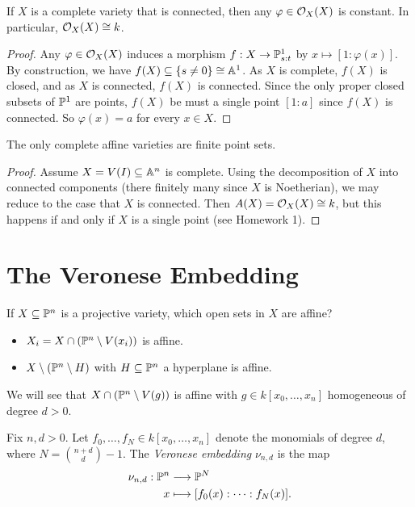 \begin{corollary}
  If $X$ is a complete variety that is
  connected, then any $\varphi \in \mathcal{O}_X(X)$
  is constant. In particular,
  $\mathcal{O}_X(X) \cong k$.
\end{corollary}

\begin{proof}
  Any $\varphi \in \mathcal{O}_X(X)$ induces a
  morphism $f : X \to \mathbb{P}^1_{s : t}$ by
  $x \mapsto [1 : \varphi(x)]$.
  By construction, we have
  $f(X) \subseteq \{s \ne 0\} \cong \mathbb{A}^1$.
  As $X$ is complete, $f(X)$ is closed,
  and as $X$ is connected, $f(X)$ is
  connected. Since the only proper closed
  subsets of $\mathbb{P}^1$ are points, $f(X)$
  be must a single point $[1 : a]$ since
  $f(X)$ is connected.
  So $\varphi(x) = a$ for every
  $x \in X$.
\end{proof}

\begin{corollary}
  The only complete affine varieties are
  finite point sets.
\end{corollary}

\begin{proof}
  Assume $X = V(I) \subseteq \mathbb{A}^n$ is
  complete. Using the decomposition
  of $X$ into connected components (there
  finitely many
  since $X$ is Noetherian), we may reduce
  to the case that $X$ is connected.
  Then $A(X) = \mathcal{O}_X(X) \cong k$, but this happens
  if and only if $X$ is a single point
  (see Homework 1).
\end{proof}

\section{The Veronese Embedding}

\begin{remark}
  If $X \subseteq \mathbb{P}^n$ is a projective
  variety, which open sets in $X$ are
  affine?
  \begin{itemize}
    \item $X_i = X \cap (\mathbb{P}^n \setminus
      V(x_i))$ is affine.
    \item $X \setminus (\mathbb{P}^n \setminus H)$
      with $H \subseteq \mathbb{P}^n$ a
      hyperplane is affine.
  \end{itemize}
  We will see that
  $X \cap (\mathbb{P}^n \setminus V(g))$ is affine
  with $g \in k[x_0, \ldots, x_n]$
  homogeneous of degree $d > 0$.
\end{remark}

\begin{definition}
  Fix $n , d > 0$. Let
  $f_0, \dots, f_N \in k[x_0, \ldots, x_n]$
  denote the monomials of degree $d$, where
  $N = \binom{n + d}{d} - 1$. The
  \emph{Veronese embedding} $\nu_{n, d}$
  is the map
  \begin{align*}
    \nu_{n, d} : \mathbb{P}^n
    &\longrightarrow \mathbb{P}^N \\
    x &\longmapsto [f_0(x) : \cdots : f_N(x)].
  \end{align*}
\end{definition}

